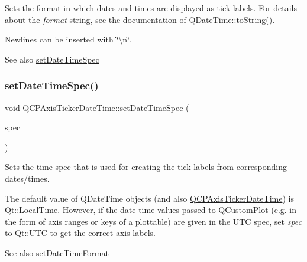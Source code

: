 Sets the format in which dates and times are displayed as tick labels. For details about the {\itshape format} string, see the documentation of Q\+Date\+Time\+::to\+String().

Newlines can be inserted with \char`\"{}\textbackslash{}n\char`\"{}.

\begin{DoxySeeAlso}{See also}
\mbox{\hyperlink{class_q_c_p_axis_ticker_date_time_afbd987c7197e42ab61e67fb1c38abebc}{set\+Date\+Time\+Spec}} 
\end{DoxySeeAlso}
\mbox{\label{class_q_c_p_axis_ticker_date_time_afbd987c7197e42ab61e67fb1c38abebc}} 
\subsubsection{\texorpdfstring{setDateTimeSpec()}{setDateTimeSpec()}}
{\footnotesize\ttfamily void Q\+C\+P\+Axis\+Ticker\+Date\+Time\+::set\+Date\+Time\+Spec (\begin{DoxyParamCaption}\item[{Qt\+::\+Time\+Spec}]{spec }\end{DoxyParamCaption})}

Sets the time spec that is used for creating the tick labels from corresponding dates/times.

The default value of Q\+Date\+Time objects (and also \mbox{\hyperlink{class_q_c_p_axis_ticker_date_time}{Q\+C\+P\+Axis\+Ticker\+Date\+Time}}) is {\ttfamily Qt\+::\+Local\+Time}. However, if the date time values passed to \mbox{\hyperlink{class_q_custom_plot}{Q\+Custom\+Plot}} (e.\+g. in the form of axis ranges or keys of a plottable) are given in the U\+TC spec, set {\itshape spec} to {\ttfamily Qt\+::\+U\+TC} to get the correct axis labels.

\begin{DoxySeeAlso}{See also}
\mbox{\hyperlink{class_q_c_p_axis_ticker_date_time_ad52660a82f688395468674d555f6a86b}{set\+Date\+Time\+Format}} 
\end{DoxySeeAlso}
\mbox{\label{class_q_c_p_axis_ticker_date_time_a5388e048cbd32cf1ba730b9f1859eb5c}} 
